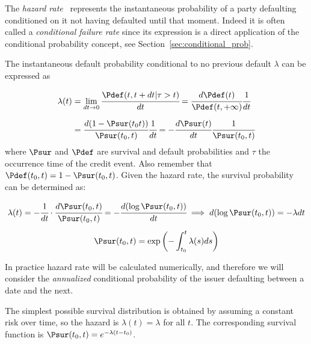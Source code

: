 The \emph{hazard rate}~\cite{bib:hazard} represents the instantaneous probability of a party defaulting conditioned on it not having defaulted until that moment. Indeed it is often called a \emph{conditional failure rate} since its expression is a direct application of the conditional probability concept, see Section~\ref{sec:conditional_prob}.

The instantaneous default probability conditional to no previous default $\lambda$ can be expressed as

\begin{equation}
\begin{split}
\lambda(t)& = \lim_{dt\rightarrow 0} \cfrac{\Pdef(t, t+dt|\tau> t)}{dt} = \cfrac{d\Pdef(t)}{\Pdef(t, +\infty)}\cfrac{1}{dt}\\[5 pt] &
= \cfrac{d(1-\Psur(t_0 t))}{\Psur(t_0, t)}\cfrac{1}{dt} = -\cfrac{d\Psur(t)}{dt}\cfrac{1}{\Psur(t_0, t)}
\end{split}
\end{equation}
where $\Psur$ and $\Pdef$ are survival and default probabilities and $\tau$ the occurrence time of the credit event.
Also remember that $\Pdef(t_0, t) = 1 - \Psur(t_0, t)$. Given the hazard rate, the survival probability can be determined as:


\begin{equation}
\begin{gathered}
\lambda(t) = -\cfrac{1}{dt}\cdot\cfrac{d\Psur(t_0, t)}{\Psur(t_0, t)} = -\cfrac{d(\log\Psur(t_0, t))}{dt} \implies d(\log\Psur(t_0, t)) = -\lambda dt\\[5pt]
\Psur(t_0, t) = \mathrm{exp}\left(-\int_{t_0}^{t}\lambda(s) ds\right)
\end{gathered}
\label{eq:constant_hazard_rate_prob}
\end{equation}

In practice hazard rate will be calculated numerically, and therefore we will consider the \emph{annualized} conditional probability of the issuer defaulting between a date and the next.

\label{sec:constant_hazard_rate}
The simplest possible survival distribution is obtained by assuming a constant risk over time, so the hazard is $\lambda (t)=\lambda$ for all $t$. The corresponding survival function is $\Psur(t_0, t) = e^{-\lambda (t-t_0)}$.

